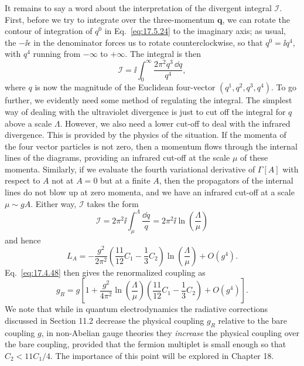 It remains to say a word about the interpretation of the divergent integral
$\mathcal I$. First, before we try to integrate over the three-momentum
$\mathbf q$, we can rotate the contour of integration of $q^0$ in
Eq.~\eqref{eq:17.5.24} to the imaginary axis; as usual, the $-\ii\epsilon$ in
the denominator forces us to rotate counterclockwise, so that $q^0=\ii q^4$,
with $q^4$ running from $-\infty$ to $+\infty$. The integral is then
\begin{equation}
\mathcal I=\ii\int_0^\infty\frac{2\pi^2q^3\,\dd q}{q^4},
\label{eq:17.5.38}
\end{equation}
where $q$ is now the magnitude of the Euclidean four-vector
$(q^1,q^2,q^3,q^4)$. To go further, we evidently need some method of
regulating the integral. The simplest way of dealing with the ultraviolet
divergence is just to cut off the integral for $q$ above a scale $\Lambda$.
However, we also need a lower cut-off to deal with the infrared divergence.
This is provided by the physics of the situation. If the momenta of the four
vector particles is not zero, then a momentum flows through the internal
lines of the diagrams, providing an infrared cut-off at the scale $\mu$ of
these momenta. Similarly, if we evaluate the fourth variational derivative
of $\Gamma[A]$ with respect to $A$ not at $A=0$ but at a finite $A$, then the
propagators of the internal lines do not blow up at zero momenta, and we
have an infrared cut-off at a scale $\mu\sim gA$. Either way, $\mathcal I$
takes the form
\begin{equation}
\mathcal I=2\pi^2\ii\int_\mu^\Lambda\frac{\dd q}{q}
=2\pi^2\ii\ln\left(\frac{\Lambda}{\mu}\right)
\label{eq:17.5.39}
\end{equation}
and hence
\begin{equation}
L_A=-\frac{g^2}{2\pi^2}
\left(\frac{11}{12}C_1-\frac13C_2\right)
\ln\left(\frac{\Lambda}{\mu}\right)+O(g^4).
\label{eq:17.5.40}
\end{equation}
Eq.~\eqref{eq:17.4.48} then gives the renormalized coupling as
\begin{equation}
g_R=g\left[1+\frac{g^2}{4\pi^2}\ln\left(\frac{\Lambda}{\mu}\right)
\left(\frac{11}{12}C_1-\frac13C_2\right)+O(g^4)\right].
\label{eq:17.5.41}
\end{equation}
We note that while in quantum electrodynamics the radiative corrections
discussed in Section 11.2 decrease the physical coupling $g_R$ relative to
the bare coupling $g$, in non-Abelian gauge theories they \emph{increase} the
physical coupling over the bare coupling, provided that the fermion multiplet
is small enough so that $C_2<11C_1/4$. The importance of this point will be
explored in Chapter 18.

